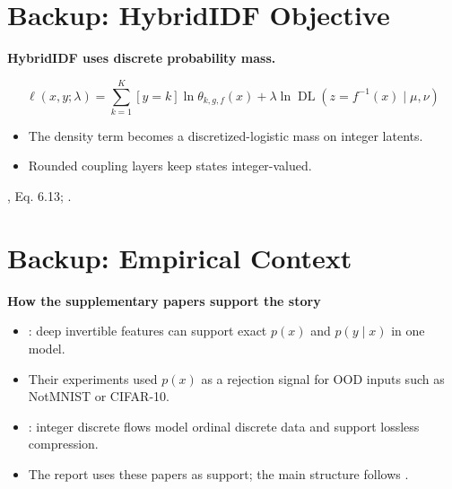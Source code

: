 \documentclass[fleqn,compress,utf8,aspectratio=169,t]{beamer}
\makeatletter
\newcommand{\mainclaim}[1]{%
  {\Large\bfseries #1\par}
}
\newcommand{\smallsource}[1]{%
  {\scriptsize\color{lmu@lightgray}#1\par}
}
\makeatother
\begin{document}
\section{Backup: HybridIDF Objective}
\begin{frame}[noframenumbering]
  \mainclaim{HybridIDF uses discrete probability mass.}

  \vspace{0.15cm}
  \small
  \begin{equation*}
    \ell(x,y;\lambda)
    =
    \sum_{k=1}^{K}[y=k]\ln\theta_{k,g,f}(x)
    +
    \lambda \ln \operatorname{DL}\!\left(z=f^{-1}(x)\mid \mu,\nu\right)
  \end{equation*}
  \normalsize

  \vspace{0.2cm}
  \begin{itemize}
    \item The density term becomes a discretized-logistic mass on integer latents.
    \item Rounded coupling layers keep states integer-valued.
  \end{itemize}

  \smallsource{\textcite{tomczak2024deep}, Eq. 6.13; \textcite{hoogeboom2019integer}.}
\end{frame}

\section{Backup: Empirical Context}
\begin{frame}[noframenumbering]
  \mainclaim{How the supplementary papers support the story}

  \vspace{0.3cm}
  \begin{itemize}
    \item \textcite{nalisnick2019hybrid}: deep invertible features can support exact \(p(x)\) and \(p(y\mid x)\) in one model.
    \item Their experiments used \(p(x)\) as a rejection signal for OOD inputs such as NotMNIST or CIFAR-10.
    \item \textcite{hoogeboom2019integer}: integer discrete flows model ordinal discrete data and support lossless compression.
    \item The report uses these papers as support; the main structure follows \textcite{tomczak2024deep}.
  \end{itemize}
\end{frame}
\end{document}
